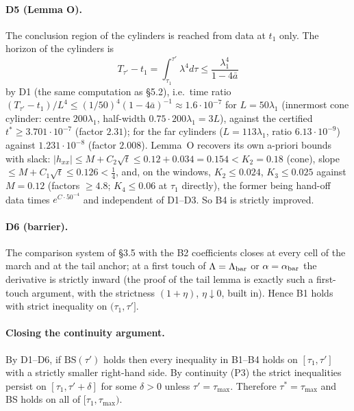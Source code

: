 \documentclass[11pt]{article}
\theoremstyle{definition}
\theoremstyle{remark}
\begin{document}
\paragraph{D5 (Lemma O).} The conclusion region of the cylinders is reached from data at $t_1$ only. The horizon of the cylinders is
\[
T_{\tau'}-t_1=\int_{\tau_1}^{\tau'}\lambda^4d\tau\le\frac{\lambda_1^4}{1-4\bar a}
\]
by D1 (the same computation as \S5.2), i.e.\ time ratio $(T_{\tau'}-t_1)/L^4\le(1/50)^4(1-4\bar a)^{-1}\approx1.6\cdot10^{-7}$ for $L=50\lambda_1$ (innermost cone cylinder: centre $200\lambda_1$, half-width $0.75\cdot200\lambda_1=3L$), against the certified $t^*\ge3.701\cdot10^{-7}$ (factor $2.31$); for the far cylinders ($L=113\lambda_1$, ratio $6.13\cdot10^{-9}$) against $1.231\cdot10^{-8}$ (factor $2.008$). Lemma~O recovers its own a-priori bounds with slack: $|h_{xx}|\le M+C_2\sqrt t\le0.12+0.034=0.154<K_2=0.18$ (cone), slope $\le M+C_1\sqrt t\le0.126<\tfrac14$, and, on the windows, $K_2\le0.024$, $K_3\le0.025$ against $M=0.12$ (factors $\ge4.8$; $K_4\le0.06$ at $\tau_1$ directly), the former being hand-off data times $e^{C\cdot50^{-4}}$ and independent of D1--D3. So B4 is strictly improved.

\paragraph{D6 (barrier).} The comparison system of \S3.5 with the B2 coefficients closes at every cell of the march and at the tail anchor; at a first touch of $\Lambda=\Lambda_{\rm bar}$ or $\alpha=\alpha_{\rm bar}$ the derivative is strictly inward (the proof of the tail lemma is exactly such a first-touch argument, with the strictness $(1+\eta)$, $\eta\downarrow0$, built in). Hence B1 holds with strict inequality on $(\tau_1,\tau']$.

\paragraph{Closing the continuity argument.} By D1--D6, if $\mathrm{BS}(\tau')$ holds then every inequality in B1--B4 holds on $[\tau_1,\tau']$ with a strictly smaller right-hand side. By continuity (P3) the strict inequalities persist on $[\tau_1,\tau'+\delta]$ for some $\delta>0$ unless $\tau'=\tau_{\max}$. Therefore $\tau^\ast=\tau_{\max}$ and BS holds on all of $[\tau_1,\tau_{\max})$.
\end{document}
